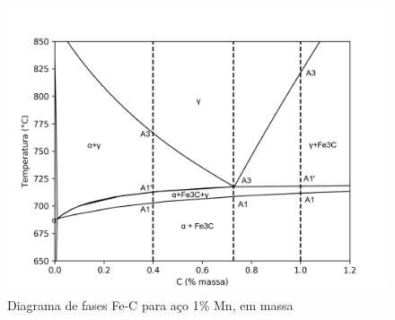 \documentclass[brazil,tf,epusp]{usp}  %
\begin{document}
\begin{figure}[ht!]
  \includegraphics[width=.9\textwidth]{img/Fe-1Mn-C_isopleth_edited.png}
  \caption{Diagrama de fases Fe-C para aço 1\% Mn, em massa}
  \label{fig:fe-1mn-C_isopleth}
\end{figure}
\end{document}
